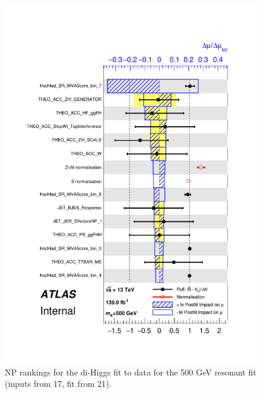 \begin{figure}
\centering
\includegraphics[width=.8\textwidth]{figures/results/HH/HadHad/HadHadFit21062021/PullsAndRankings/pulls_SigXsecOverSM_500.pdf}
\caption{NP rankings for the di-Higgs \hadhad fit to data for the 500 GeV resonant fit (inputs from 17, fit from 21).}
\label{fig:HadHadPostfitNPRankings2HDM500}
\end{figure}


